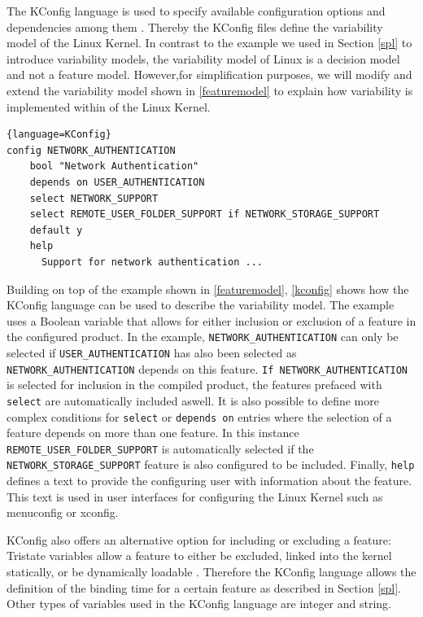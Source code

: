\documentclass[a4paper]{article}
\begin{document}
The KConfig language is used to specify available configuration options and dependencies among them \cite{variabilitymodel-linux}. Thereby the KConfig files define the variability model of the Linux Kernel. In contrast to the example we used in Section \ref{spl} to introduce variability models, the variability model of Linux is a decision model and not a feature model. However,for simplification purposes, we will modify and extend the variability model shown in \autoref{featuremodel} to explain how variability is implemented within of the Linux Kernel. 

\begin{lstlisting}[caption= KConfig Language, label=kconfig]{language=KConfig}
config NETWORK_AUTHENTICATION
	bool "Network Authentication"
	depends on USER_AUTHENTICATION
	select NETWORK_SUPPORT
	select REMOTE_USER_FOLDER_SUPPORT if NETWORK_STORAGE_SUPPORT
	default y
	help
	  Support for network authentication ...
\end{lstlisting}
 
Building on top of the example shown in \autoref{featuremodel}, \autoref{kconfig} shows how the KConfig language can be used to describe the variability model. The example uses a Boolean variable that allows for either inclusion or exclusion of a feature in the configured product.
In the example, \texttt{NETWORK\_\-AUTHENTICATION} can only be selected if \texttt{USER\_\-AUTHENTICATION} has also been selected as \texttt{NETWORK\_\-AUTHENTICATION} depends on this feature. \texttt{If NETWORK\_\-AUTHENTICATION} is selected for inclusion in the compiled product, the features prefaced with \texttt{select} are automatically included aswell. It is also possible to define more complex conditions for \texttt{select} or \texttt{depends on} entries where the selection of a feature depends on more than one feature. In this instance \texttt{REMOTE\-\_USER\_\-FOLDER\_\-SUPPORT} is automatically selected if the \texttt{NETWORK\_\-STORAGE\-\_SUPPORT} feature is also configured to be included. Finally, \texttt{help} defines a text to provide the configuring user with information about the feature. This text is used in user interfaces for configuring the Linux Kernel such as menuconfig or xconfig.

 KConfig also offers an alternative option for including or excluding a feature: Tristate variables allow a feature to either be excluded, linked into the kernel statically, or be dynamically loadable \cite{variabilitymodel-linux}. Therefore the KConfig language allows the definition of the binding time for a certain feature as described in Section \ref{spl}. Other types of variables used in the KConfig language are integer and string.
\end{document}
